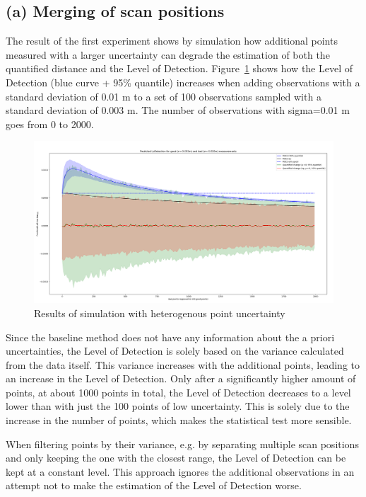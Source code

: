 \documentclass[preprint,12pt,3p]{elsarticle}
\begin{document}
\subsection{(a) Merging of scan positions}
The result of the first experiment shows by simulation how additional points measured with a larger uncertainty can degrade the estimation of both the quantified distance and the Level of Detection. Figure~\ref{fig:plot_a} shows how the Level of Detection (blue curve + 95\% quantile) increases when adding observations with a standard deviation of 0.01 m to a set of 100 observations sampled with a standard deviation of 0.003 m. The number of observations with sigma=0.01 m goes from 0 to 2000. 

\begin{figure}
    \centering
    \includegraphics[width=0.9\linewidth]{figs/experiment1.png}
    \caption{Results of simulation with heterogenous point uncertainty}
    \label{fig:plot_a}
\end{figure}

Since the baseline method does not have any information about the a priori uncertainties, the Level of Detection is solely based on the variance calculated from the data itself. This variance increases with the additional points, leading to an increase in the Level of Detection. Only after a significantly higher amount of points, at about 1000 points in total, the Level of Detection decreases to a level lower than with just the 100 points of low uncertainty. This is solely due to the increase in the number of points, which makes the statistical test more sensible.

When filtering points by their variance, e.g. by separating multiple scan positions and only keeping the one with the closest range, the Level of Detection can be kept at a constant level. This approach ignores the additional observations in an attempt not to make the estimation of the Level of Detection worse.
\end{document}
